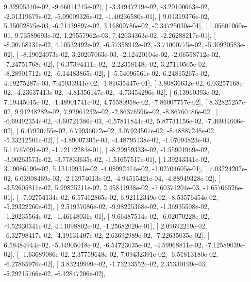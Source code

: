 \documentclass{article}
\begin{document}
          9.32995340e-02,  -9.66011245e-02],
       [ -3.34947219e-02,  -3.20100663e-02,  -2.01319679e-02,
         -5.09009326e-02,  -1.40236580e-01],
       [  9.01319376e-02,   5.35002875e-03,  -6.21439897e-02,
          3.16809786e-02,  -2.34725030e-01],
       [  1.05601060e-01,   9.73589693e-02,   1.29557962e-03,
          7.42634363e-02,  -2.26288217e-01],
       [ -8.00768131e-02,   4.10532492e-02,  -6.57358912e-02,
         -3.71000775e-02,  -5.30920583e-02],
       [ -8.19024073e-02,   3.20207063e-03,  -2.12420104e-02,
         -2.06558712e-02,  -7.24751768e-02],
       [  6.37394411e-02,  -2.22358148e-02,   3.27110505e-02,
         -8.28901712e-02,  -6.14483865e-02],
       [ -5.54096561e-02,   6.24815267e-02,   4.19275287e-03,
          7.45933941e-02,  -1.81635447e-01],
       [  3.80836632e-02,   6.03257168e-02,  -4.23637413e-02,
         -4.81356147e-02,  -4.73454296e-02],
       [  6.13910393e-02,   7.19445015e-02,  -1.48901741e-02,
          4.75580958e-02,  -7.86007757e-02],
       [  8.32825257e-02,   9.91248282e-02,   7.92961252e-02,
         -2.86376596e-02,  -8.86760486e-02],
       [ -6.69492354e-02,  -3.60721386e-03,  -6.57811844e-02,
          5.87731156e-02,  -7.46934606e-02],
       [  6.47920755e-02,   6.79936072e-02,   3.07924507e-02,
         -8.48887248e-02,  -5.33212501e-02],
       [ -4.89007305e-03,  -4.48795138e-02,  -1.07094823e-03,
          5.14767091e-02,  -1.72112284e-01],
       [ -8.29959333e-02,  -1.55901969e-02,  -3.00263573e-02,
         -3.77833635e-02,  -1.51657517e-01],
       [  1.39243341e-02,   3.19086190e-02,   5.13149931e-02,
         -4.08992414e-02,  -1.02704605e-01],
       [  7.03224202e-02,   6.03908469e-03,  -2.13974013e-02,
         -4.94515421e-04,  -4.88949328e-02],
       [ -3.52605811e-02,   5.99825211e-02,   2.45841938e-02,
         -7.60371204e-03,  -1.65706526e-01],
       [ -7.02754134e-02,   6.57462865e-02,   6.92112349e-02,
         -8.53576454e-02,  -5.29322260e-02],
       [  2.51937086e-02,  -9.98225368e-02,  -1.36935508e-02,
         -1.20235564e-02,  -1.46148031e-01],
       [  9.66487514e-02,  -6.02070228e-02,  -9.52930341e-02,
          4.11098802e-02,  -1.25682020e-01],
       [  2.09692219e-02,  -6.32798417e-02,  -4.19131407e-02,
          2.63692989e-02,  -7.22635035e-02],
       [  6.58484944e-02,  -5.34905018e-02,  -6.54723035e-02,
         -4.59968811e-02,  -7.12589039e-02],
       [ -1.63689086e-02,   2.37759648e-02,   7.09432391e-02,
         -6.51813180e-02,  -6.27865976e-02],
       [  3.83249999e-02,  -1.73233552e-02,   2.35330199e-03,
         -5.29215766e-02,  -6.12847206e-02],
\end{document}
